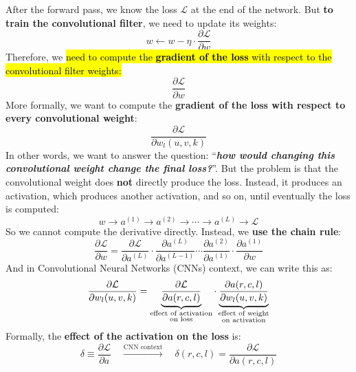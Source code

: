 \highspace
After the forward pass, we know the loss $\mathcal{L}$ at the end of the network. But \textbf{to train the convolutional filter}, we need to update its weights:
\begin{equation*}
    w \leftarrow w - \eta \cdot \frac{\partial\mathcal{L}}{\partial w}
\end{equation*}
Therefore, we \hl{need to compute the \textbf{gradient of the loss} with respect to the convolutional filter weights:}
\begin{equation*}
    \frac{\partial\mathcal{L}}{\partial w}
\end{equation*}
More formally, we want to compute the \textbf{gradient of the loss with respect to every convolutional weight}:
\begin{equation*}
    \frac{\partial\mathcal{L}}{\partial w_{l}(u,v,k)}
\end{equation*}
In other words, we want to answer the question: ``\emph{\textbf{how would changing this convolutional weight change the final loss?}}''. But the problem is that the convolutional weight does \textbf{not} directly produce the loss. Instead, it produces an activation, which produces another activation, and so on, until eventually the loss is computed:
\begin{equation*}
    w \to a^{(1)} \to a^{(2)} \to \cdots \to a^{(L)} \to \mathcal{L}
\end{equation*}
So we cannot compute the derivative directly. Instead, we \textbf{use the chain rule}:
\begin{equation*}
    \frac{\partial\mathcal{L}}{\partial w}
    =
    \frac{\partial\mathcal{L}}{\partial a^{(L)}} \cdot
    \frac{\partial a^{(L)}}{\partial a^{(L-1)}} \cdots
    \frac{\partial a^{(2)}}{\partial a^{(1)}} \cdot
    \frac{\partial a^{(1)}}{\partial w}
\end{equation*}
And in Convolutional Neural Networks (CNNs) context, we can write this as:
\begin{equation*}
    \frac{\partial\mathcal{L}}{\partial w_{l}(u,v,k)}
    =
    \underbrace{\frac{\partial \mathcal{L}}{\partial a(r,c,l)}}_{%
        \substack{\text{effect of activation}\\\text{on loss}}
    } \cdot
    \underbrace{\frac{\partial a(r,c,l)}{\partial w_{l}(u,v,k)}}_{%
        \substack{\text{effect of weight}\\\text{on activation}}
    }
\end{equation*}
Formally, the \textbf{effect of the activation on the loss} is:
\begin{equation*}
    \delta \equiv \frac{\partial\mathcal{L}}{\partial a} \quad \xrightarrow{\text{CNN context}} \quad \delta(r, c, l) = \frac{\partial\mathcal{L}}{\partial a(r, c, l)}
\end{equation*}
